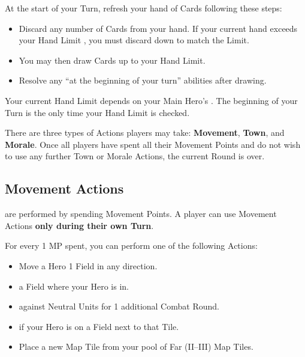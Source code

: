 
\vspace{-\baselineskip}

\begin{multicols}{2}

At the start of your Turn, refresh your hand of Cards following these steps:
\begin{itemize}
  \item Discard any number of Cards from your hand.
If your current hand exceeds your Hand Limit , you must discard down to match the Limit.
  \item You may then draw Cards up to your Hand Limit.
  \item Resolve any ``at the beginning of your turn'' abilities after drawing.
\end{itemize}
Your current Hand Limit depends on your Main Hero's .
The beginning of your Turn is the only time your Hand Limit is checked.\par
There are three types of Actions players may take: \textbf{Movement}, \textbf{Town}, and \textbf{Morale}.
Once all players have spent all their Movement Points and do not wish to use any further Town or Morale Actions, the current Round is over.

\subsection*{Movement Actions}
 are performed by spending Movement Points.
A player can use Movement Actions \textbf{only during their own Turn}.\par
For every 1 MP spent, you can perform one of the following Actions:
\begin{itemize}
  \item Move a Hero 1 Field in any direction.
  \item {} a Field where your Hero is in.
  \item {} against Neutral Units for 1 additional Combat Round.
  \item {} if your Hero is on a Field next to that Tile.
  \item Place a new Map Tile from your pool of Far (II–III) Map Tiles.
\end{itemize}


\end{multicols}
